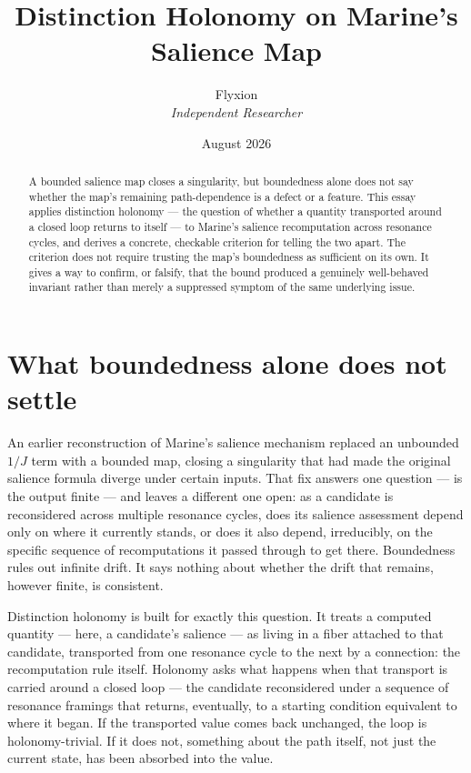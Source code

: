 \documentclass[11pt]{article}
\title{Distinction Holonomy on Marine's Salience Map}
\author{Flyxion \\ \textit{Independent Researcher}}
\date{August 2026}
\begin{document}
\maketitle

\begin{abstract}
A bounded salience map closes a singularity, but boundedness alone does not say whether the map's remaining path-dependence is a defect or a feature. This essay applies distinction holonomy — the question of whether a quantity transported around a closed loop returns to itself — to Marine's salience recomputation across resonance cycles, and derives a concrete, checkable criterion for telling the two apart. The criterion does not require trusting the map's boundedness as sufficient on its own. It gives a way to confirm, or falsify, that the bound produced a genuinely well-behaved invariant rather than merely a suppressed symptom of the same underlying issue.
\end{abstract}

\section{What boundedness alone does not settle}

An earlier reconstruction of Marine's salience mechanism replaced an unbounded $1/J$ term with a bounded map, closing a singularity that had made the original salience formula diverge under certain inputs. That fix answers one question — is the output finite — and leaves a different one open: as a candidate is reconsidered across multiple resonance cycles, does its salience assessment depend only on where it currently stands, or does it also depend, irreducibly, on the specific sequence of recomputations it passed through to get there. Boundedness rules out infinite drift. It says nothing about whether the drift that remains, however finite, is consistent.

Distinction holonomy is built for exactly this question. It treats a computed quantity — here, a candidate's salience — as living in a fiber attached to that candidate, transported from one resonance cycle to the next by a connection: the recomputation rule itself. Holonomy asks what happens when that transport is carried around a closed loop — the candidate reconsidered under a sequence of resonance framings that returns, eventually, to a starting condition equivalent to where it began. If the transported value comes back unchanged, the loop is holonomy-trivial. If it does not, something about the path itself, not just the current state, has been absorbed into the value.
\end{document}
